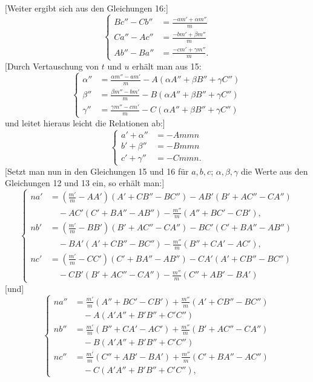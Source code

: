 %
[Weiter ergibt sich aus den Gleichungen 16:]
\begin{equation}\tag*{[19]}
\left\{\begin{aligned}
Bc''-Cb''&=\frac{-am'+\alpha m''}{m}\\
Ca''-Ac''&=\frac{-bm'+\beta m''}{m}\\
Ab''-Ba''&=\frac{-cm'+\gamma m''}{m}.
\end{aligned}\right.
\end{equation}
[Durch Vertauschung von $t$ und $u$ erhält man aus 15:
\[
\left\{\begin{aligned}
\alpha''&=\frac{\alpha m''-am'}{m}-A(\alpha A''+\beta B''+\gamma C'')\\
\beta''&=\frac{\beta m''-bm'}{m}-B(\alpha A''+\beta B''+\gamma C'')\\
\gamma''&=\frac{\gamma m''-cm'}{m}-C(\alpha A''+\beta B''+\gamma C'')
\end{aligned}\right.
\]
und leitet hieraus leicht die Relationen ab:]
\begin{equation}\tag*{[20]}
\left\{\begin{aligned}
a'+\alpha''&=-Ammn\\
b'+\beta''&=-Bmmn\\
c'+\gamma''&=-Cmmn.
\end{aligned}\right.
\end{equation}
[Setzt man nun in den Gleichungen 15 und 16 für $a,b,c$; $\alpha,\beta,\gamma$ die Werte aus den Gleichungen 12 und 13 ein, so erhält man:]
\begin{equation}\tag*{[21]}
\left\{\begin{aligned}
na'&=\left(\frac{m'}m-AA'\right)(A'+CB''-BC'')-AB'(B'+AC''-CA'')\\
&\quad-AC'(C'+BA''-AB'')-\frac{m''}m(A''+BC'-CB'),\\[4pt]
nb'&=\left(\frac{m'}m-BB'\right)(B'+AC''-CA'')-BC'(C'+BA''-AB'')\\
&\quad-BA'(A'+CB''-BC'')-\frac{m''}m(B''+CA'-AC'),\\[4pt]
nc'&=\left(\frac{m'}m-CC'\right)(C'+BA''-AB'')-CA'(A'+CB''-BC'')\\
&\quad-CB'(B'+AC''-CA'')-\frac{m''}m(C''+AB'-BA')
\end{aligned}\right.
\end{equation}
[und]
\begin{equation}\tag*{[22]}
\left\{\begin{aligned}
na''&=\frac{m'}m(A''+BC'-CB')+\frac{m''}m(A'+CB''-BC'')\\
&\quad-A(A'A''+B'B''+C'C'')\\[4pt]
nb''&=\frac{m'}m(B''+CA'-AC')+\frac{m''}m(B'+AC''-CA'')\\
&\quad-B(A'A''+B'B''+C'C'')\\[4pt]
nc''&=\frac{m'}m(C''+AB'-BA')+\frac{m''}m(C'+BA''-AC'')\\
&\quad-C(A'A''+B'B''+C'C''),
\end{aligned}\right.
\end{equation}
